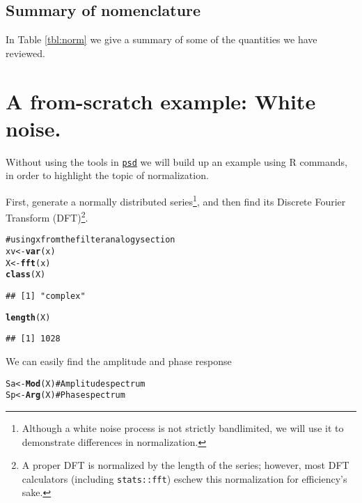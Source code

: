 \documentclass[11pt]{article}\usepackage{graphicx, color}
\makeatletter
\newcommand{\hlfunctioncall}[1]{\textcolor[rgb]{0.501960784313725,0,0.329411764705882}{\textbf{#1}}}%
\newcommand{\hlcomment}[1]{\textcolor[rgb]{0.180392156862745,0.6,0.341176470588235}{#1}}%
\newenvironment{kframe}{%
 \def\at@end@of@kframe{}%
 \ifinner\ifhmode%
  \def\at@end@of@kframe{\end{minipage}}%
  \begin{minipage}{\columnwidth}%
 \fi\fi%
 \def\FrameCommand##1{\hskip\@totalleftmargin \hskip-\fboxsep
 \colorbox{shadecolor}{##1}\hskip-\fboxsep
     \hskip-\linewidth \hskip-\@totalleftmargin \hskip\columnwidth}%
 \MakeFramed {\advance\hsize-\width
   \@totalleftmargin\z@ \linewidth\hsize
   \@setminipage}}%
 {\par\unskip\endMakeFramed%
 \at@end@of@kframe}
\newenvironment{knitrout}{}{} %
\newcommand{\Rcmd}[1]{\texttt{#1}}
\newcommand{\psd}[0]{\href{http://abarbour.github.com/psd/}{\color{blue}\Rcmd{psd}}}
\makeatother
\begin{document}
\subsection{Summary of nomenclature}

In Table \ref{tbl:norm} we give a summary of some
of the quantities we have reviewed.



\section{A from-scratch example: White noise.}
Without using the tools in \psd{} we will build up an example
using R commands, in order to highlight the topic of normalization.

First, generate a normally distributed series\footnote{
Although a white noise process is not strictly bandlimited,
we will use it to demonstrate differences in normalization.
}, 
and then find its Discrete Fourier Transform 
(DFT)\footnote{
A proper DFT is normalized by the length of the series; however, most
DFT calculators (including \Rcmd{stats::fft}) eschew this normalization for 
efficiency's sake.
}.
\begin{knitrout}
\color{fgcolor}\begin{kframe}
\begin{alltt}
\hlcomment{# using x from the filter analogy section}
xv <- \hlfunctioncall{var}(x)
X <- \hlfunctioncall{fft}(x)
\hlfunctioncall{class}(X)
\end{alltt}
\begin{verbatim}
## [1] "complex"
\end{verbatim}
\begin{alltt}
\hlfunctioncall{length}(X)
\end{alltt}
\begin{verbatim}
## [1] 1028
\end{verbatim}
\end{kframe}
\end{knitrout}


We can easily find the amplitude and phase response
\begin{knitrout}
\color{fgcolor}\begin{kframe}
\begin{alltt}
Sa <- \hlfunctioncall{Mod}(X)  \hlcomment{# Amplitude spectrum}
Sp <- \hlfunctioncall{Arg}(X)  \hlcomment{# Phase spectrum}
\end{alltt}
\end{kframe}
\end{knitrout}
\end{document}
